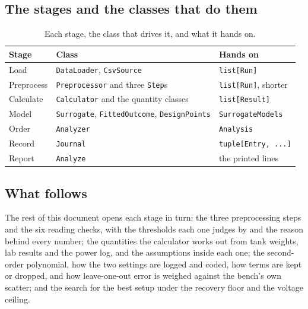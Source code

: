 \subsection{The stages and the classes that do them}

\begin{table}[htbp]
  \centering
  \small
  \caption{Each stage, the class that drives it, and what it hands on.}
  \label{tab:stages}
  \begin{tabular}{@{}lll@{}}
    \toprule
    Stage & Class & Hands on \\
    \midrule
    Load       & \texttt{DataLoader}, \texttt{CsvSource}      & \texttt{list[Run]} \\
    Preprocess & \texttt{Preprocessor} and three \texttt{Step}s & \texttt{list[Run]}, shorter \\
    Calculate  & \texttt{Calculator} and the quantity classes & \texttt{list[Result]} \\
    Model      & \texttt{Surrogate}, \texttt{FittedOutcome}, \texttt{DesignPoints}
               & \texttt{SurrogateModels} \\
    \midrule
    Order      & \texttt{Analyzer}  & \texttt{Analysis} \\
    Record     & \texttt{Journal}   & \texttt{tuple[Entry, ...]} \\
    Report     & \texttt{Analyze}   & the printed lines \\
    \bottomrule
  \end{tabular}
\end{table}

\subsection{What follows}

The rest of this document opens each stage in turn: the three preprocessing steps and the six
reading checks, with the thresholds each one judges by and the reason behind every number; the
quantities the calculator works out from tank weights, lab results and the power log, and the
assumptions inside each one; the second-order polynomial, how the two settings are logged and
coded, how terms are kept or dropped, and how leave-one-out error is weighed against the bench's
own scatter; and the search for the best setup under the recovery floor and the voltage ceiling.
